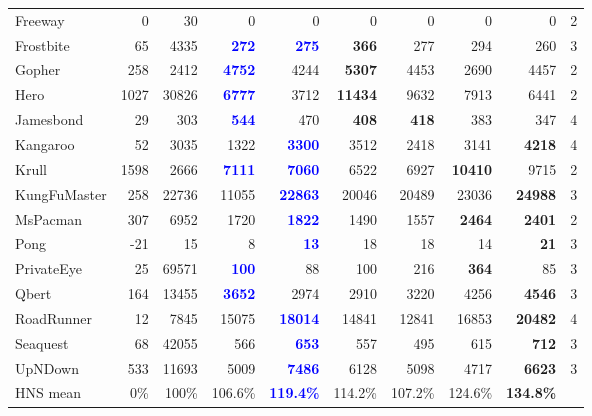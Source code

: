 \documentclass{article} %
\begin{document}
\begin{table}[h]
{\begin{tabular}{lrr|rr|rrrr|r}
    Freeway & 0 & 30 & 0 & 0 & 0 & 0 & 0 & 0 & 2\\
    Frostbite & 65 & 4335 & \textcolor{Blue}{\textbf{272}} & \textcolor{Blue}{\textbf{275}} & \textcolor{BrickRed}{\textbf{366}} & 277 & 294 & 260 & 3\\
    Gopher & 258 & 2412 & \textcolor{Blue}{\textbf{4752}} & 4244 & \textcolor{BrickRed}{\textbf{5307}} & 4453 & 2690 & 4457 & 2\\
    Hero & 1027 & 30826 & \textcolor{Blue}{\textbf{6777}} & 3712 & \textcolor{BrickRed}{\textbf{11434}} & 9632 & 7913 & 6441 & 2\\
    Jamesbond & 29 & 303 & \textcolor{Blue}{\textbf{544}} & 470 & \textcolor{BrickRed}{\textbf{408}} & \textcolor{BrickRed}{\textbf{418}} & 383 & 347 & 4\\
    Kangaroo & 52 & 3035 & 1322 & \textcolor{Blue}{\textbf{3300}} & 3512 & 2418 & 3141 & \textcolor{BrickRed}{\textbf{4218}} & 4\\
    Krull & 1598 & 2666 & \textcolor{Blue}{\textbf{7111}} & \textcolor{Blue}{\textbf{7060}} & 6522 & 6927 & \textcolor{BrickRed}{\textbf{10410}} & 9715 & 2\\
    KungFuMaster & 258 & 22736 & 11055 & \textcolor{Blue}{\textbf{22863}} & 20046 & 20489 & 23036 & \textcolor{BrickRed}{\textbf{24988}} & 3\\
    MsPacman & 307 & 6952 & 1720 & \textcolor{Blue}{\textbf{1822}} & 1490 & 1557 & \textcolor{BrickRed}{\textbf{2464}} & \textcolor{BrickRed}{\textbf{2401}} & 2\\
    Pong & -21 & 15 & 8 & \textcolor{Blue}{\textbf{13}} & 18 & 18 & 14 & \textcolor{BrickRed}{\textbf{21}} & 3\\
    PrivateEye & 25 & 69571 & \textcolor{Blue}{\textbf{100}} & 88 & 100 & 216 & \textcolor{BrickRed}{\textbf{364}} & 85 & 3\\
    Qbert & 164 & 13455 & \textcolor{Blue}{\textbf{3652}} & 2974 & 2910 & 3220 & 4256 & \textcolor{BrickRed}{\textbf{4546}} & 3\\
    RoadRunner & 12 & 7845 & 15075 & \textcolor{Blue}{\textbf{18014}} & 14841 & 12841 & 16853 & \textcolor{BrickRed}{\textbf{20482}} & 4\\
    Seaquest & 68 & 42055 & 566 & \textcolor{Blue}{\textbf{653}} & 557 & 495 & 615 & \textcolor{BrickRed}{\textbf{712}} & 3\\
    UpNDown & 533 & 11693 & 5009 & \textcolor{Blue}{\textbf{7486}} & 6128 & 5098 & 4717 & \textcolor{BrickRed}{\textbf{6623}} & 3\\
    \midrule
    HNS mean & 0\% & 100\%  & 106.6\% & \textcolor{Blue}{\textbf{119.4\%}} & 114.2\% & 107.2\% & 124.6\% & \textcolor{BrickRed}{\textbf{134.8\%}} \\ 

\end{tabular}}
\end{table}
\end{document}
